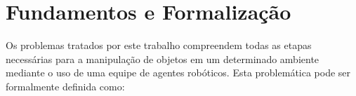 

\section{Fundamentos e Formalização} %
\label{sec:fundamentos_e_formaliza_o}

Os problemas tratados por este trabalho compreendem todas as etapas necessárias para a manipulação de objetos em um determinado ambiente mediante o uso de uma equipe de agentes robóticos.
Esta problemática pode ser formalmente definida como:

